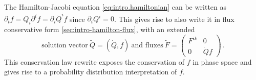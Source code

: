 The Hamil\-ton-Jacobi equation \eqref{eq:intro.hamiltonian} can be written as
$\partial_t f = \dot {Q_i}\partial^i f = \partial_i \dot  Q^i f$ since
$\partial_i Q^i=0$. This gives
rise to also write it in flux conservative form \eqref{sec:intro-hamilton-flux},
with an extended
\begin{equation}
\text{solution vector}~\tilde Q=(\dot Q, f)
~\text{and fluxes}~\tilde F=\begin{pmatrix}
 F^{ik} & 0 \\ 0 & \dot Q f
\end{pmatrix}\,.
\end{equation}
This conservation law 
rewrite exposes the
conservation of $f$ in phase space  and gives rise to a probability
distribution interpretation of $f$. 

%

